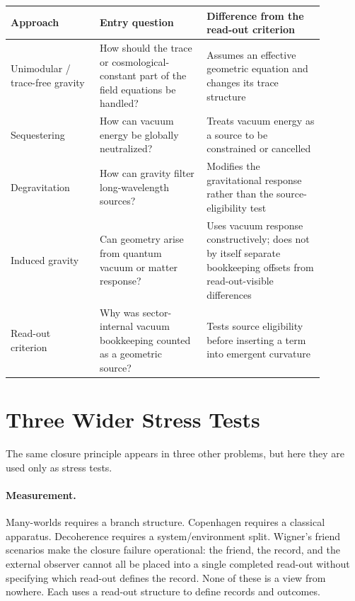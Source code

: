 \documentclass[12pt,a4paper]{article}
\theoremstyle{definition}
\theoremstyle{remark}
\begin{document}
\begin{center}
\begin{tabular}{P{0.25\linewidth}P{0.30\linewidth}P{0.33\linewidth}}
\toprule
\textbf{Approach} & \textbf{Entry question} & \textbf{Difference from the read-out criterion} \\
\midrule
Unimodular / trace-free gravity & How should the trace or cosmological-constant part of the field equations be handled? & Assumes an effective geometric equation and changes its trace structure \\
Sequestering & How can vacuum energy be globally neutralized? & Treats vacuum energy as a source to be constrained or cancelled \\
Degravitation & How can gravity filter long-wavelength sources? & Modifies the gravitational response rather than the source-eligibility test \\
Induced gravity & Can geometry arise from quantum vacuum or matter response? & Uses vacuum response constructively; does not by itself separate bookkeeping offsets from read-out-visible differences \\
Read-out criterion & Why was sector-internal vacuum bookkeeping counted as a geometric source? & Tests source eligibility before inserting a term into emergent curvature \\
\bottomrule
\end{tabular}
\end{center}

\section{Three Wider Stress Tests}
\label{sec:stress}

The same closure principle appears in three other problems, but here they are used only as stress tests.

\paragraph{Measurement.}
Many-worlds requires a branch structure. Copenhagen requires a classical apparatus. Decoherence requires a system/environment split. Wigner's friend scenarios make the closure failure operational: the friend, the record, and the external observer cannot all be placed into a single completed read-out without specifying which read-out defines the record. None of these is a view from nowhere. Each uses a read-out structure to define records and outcomes.
\end{document}
